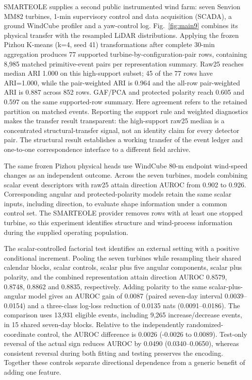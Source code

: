 \documentclass[preprint,12pt]{elsarticle}
\begin{document}
SMARTEOLE supplies a second public instrumented wind farm: seven Senvion MM82 turbines, 1-min supervisory control and data acquisition (SCADA), a ground WindCube profiler and a yaw-control log. Fig.~\ref{fig:main9} combines its physical transfer with the resampled LiDAR distributions. Applying the frozen Pizhou K-means (k=4, seed 41) transformations after complete 30-min aggregation produces 77 supported turbine-by-configuration-pair rows, containing 8,985 matched primitive-event pairs per representation summary. Raw25 reaches median ARI 1.000 on this high-support subset; 45 of the 77 rows have ARI=1.000, while the pair-weighted ARI is 0.964 and the all-row pair-weighted ARI is 0.887 across 852 rows. GAF/PCA and protected polarity reach 0.605 and 0.597 on the same supported-row summary. Here agreement refers to the retained partition on matched events. Reporting the support rule and weighted diagnostics makes the transfer result transparent: the high-support raw25 median is a concentrated structural-transfer signal, not an identity claim for every detector pair. The structural result establishes a working transfer of the event ledger and one-to-one correspondence interface to a different field archive.

The same frozen Pizhou physical heads use WindCube 80-m endpoint wind-speed changes as an independent outcome. Across the seven turbines, models combining scalar event descriptors with raw25 attain direction AUROC from 0.902 to 0.926. Corresponding angular and protected-polarity models retain the same scalar inputs, including direction, to evaluate shape information under a common control set. The SMARTEOLE provider removes rows with at least one stopped turbine, so this experiment identifies structure and wind-process information during the supplied operating population.

The scalar-controlled factorial test identifies an external setting with a positive conditional increment. Pooling the seven turbines while resampling their shared calendar blocks, scalar controls, scalar plus five angular components, scalar plus polarity, and the combined representation attain direction AUROC 0.8579, 0.8748, 0.8862 and 0.8835, respectively. Adding polarity to the same scalar-plus-angular model gives an AUROC gain of 0.0087 (paired seven-day interval 0.0039--0.0154) and a three-class log-loss reduction of 0.0135 nats (0.0091--0.0186). The comparison uses 13,931 eligible events, including 9,265 increase/decrease events, in 15 shared seven-day blocks. Relative to the independently randomized-coordinate control, the AUROC difference is 0.0026 (-0.0026 to 0.0089). Test-only reversal of the actual sign reduces AUROC by 0.0490 (0.0340--0.0650), whereas consistent reversal during both fitting and testing preserves the encoding. Together these controls separate directional dependence from a generic benefit of adding one feature.
\end{document}
